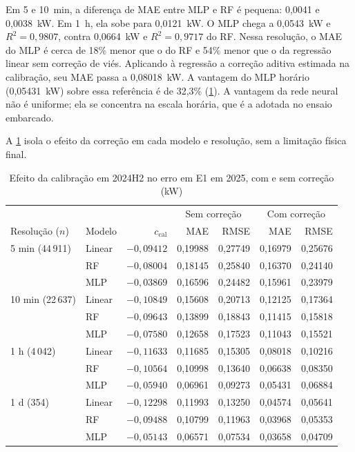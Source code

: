 Em 5 e 10~min, a diferença de MAE entre MLP e RF é pequena: 0,0041 e
0,0038~kW. Em 1~h, ela sobe para 0,0121~kW. O MLP chega a 0,0543~kW e
$R^2=0,9807$, contra 0,0664~kW e $R^2=0,9717$ do RF. Nessa resolução, o MAE
do MLP é cerca de 18\% menor que o do RF e 54\% menor que o da regressão
linear sem correção de viés. Aplicando à regressão a correção aditiva
estimada na calibração, seu MAE passa a 0,08018~kW. A vantagem do MLP
horário (0,05431~kW) sobre essa referência é de 32,3\%
(\cref{tab:ablacao-calibracao}). A vantagem da rede neural não é uniforme;
ela se concentra na escala horária, que é a adotada no ensaio embarcado.

A \cref{tab:ablacao-calibracao} isola o efeito da correção em cada modelo e
resolução, sem a limitação física final.

\begin{table}[htbp]
\centering\small
\caption{Efeito da calibração em 2024H2 no erro em E1 em 2025, com e sem
correção (kW)}
\label{tab:ablacao-calibracao}
\begin{tabular}{llrrrrr}\toprule
 & & & \multicolumn{2}{c}{Sem correção} & \multicolumn{2}{c}{Com correção}\\
Resolução ($n$) & Modelo & $c_{\mathrm{cal}}$ & MAE & RMSE & MAE & RMSE\\\midrule
5 min (44\,911) & Linear & $-0,09412$ & 0,19988 & 0,27749 & 0,16979 & 0,25676\\
 & RF & $-0,08004$ & 0,18145 & 0,25840 & 0,16370 & 0,24140\\
 & MLP & $-0,03869$ & 0,16596 & 0,24482 & 0,15961 & 0,23979\\
10 min (22\,637) & Linear & $-0,10849$ & 0,15608 & 0,20713 & 0,12125 & 0,17364\\
 & RF & $-0,09643$ & 0,13899 & 0,18843 & 0,11415 & 0,15818\\
 & MLP & $-0,07580$ & 0,12658 & 0,17523 & 0,11043 & 0,15521\\
1 h (4\,042) & Linear & $-0,11633$ & 0,11685 & 0,15305 & 0,08018 & 0,10216\\
 & RF & $-0,10564$ & 0,10998 & 0,13640 & 0,06638 & 0,08350\\
 & MLP & $-0,05940$ & 0,06961 & 0,09273 & 0,05431 & 0,06884\\
1 d (354) & Linear & $-0,12298$ & 0,11993 & 0,13250 & 0,04574 & 0,05641\\
 & RF & $-0,09488$ & 0,10799 & 0,11963 & 0,03968 & 0,05353\\
 & MLP & $-0,05143$ & 0,06571 & 0,07534 & 0,03658 & 0,04709\\\bottomrule
\end{tabular}
\end{table}


